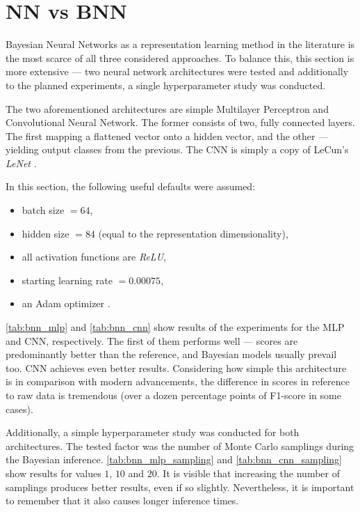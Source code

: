 \section{NN vs BNN}
Bayesian Neural Networks as a representation learning method in the literature is the most scarce of all three considered approaches. To balance this, this section is more extensive — two neural network architectures were tested and additionally to the planned experiments, a single hyperparameter study was conducted.

\vspace{\baselineskip}
The two aforementioned architectures are simple Multilayer Perceptron and Convolutional Neural Network. The former consists of two, fully connected layers. The first mapping a flattened vector onto a hidden vector, and the other — yielding output classes from the previous. The CNN is simply a copy of LeCun's \textit{LeNet} \cite{LeCun1998}.

\vspace{\baselineskip}
In this section, the following useful defaults were assumed:
\begin{itemize}
    \item batch size $=64$,
    \item hidden size $=84$ (equal to the representation dimensionality),
    \item all activation functions are \textit{ReLU},
    \item starting learning rate $=0.00075$,
    \item an Adam optimizer \cite{Kingma2014}.
\end{itemize}

\autoref{tab:bnn_mlp} and \autoref{tab:bnn_cnn} show results of the experiments for the MLP and CNN, respectively. The first of them performs well — scores are predominantly better than the reference, and Bayesian models usually prevail too. CNN achieves even better results. Considering how simple this architecture is in comparison with modern advancements, the difference in scores in reference to raw data is tremendous (over a dozen percentage points of F1-score in some cases).




\vspace{\baselineskip}
Additionally, a simple hyperparameter study was conducted for both architectures. The tested factor was the number of Monte Carlo samplings during the Bayesian inference. \autoref{tab:bnn_mlp_sampling} and \autoref{tab:bnn_cnn_sampling} show results for values $1$, $10$ and $20$. It is visible that increasing the number of samplings produces better results, even if so slightly. Nevertheless, it is important to remember that it also causes longer inference times.

